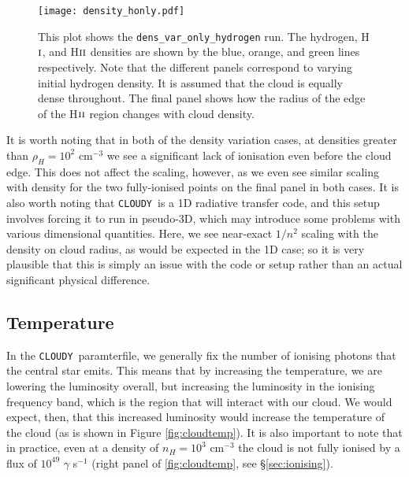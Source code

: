 \documentclass[a4paper]{article}
\newcommand{\cloudy}{{\tt CLOUDY}~}
\begin{document}
\begin{figure}[!h]
\centering
\texttt{[image: density\_honly.pdf]}
    \caption{\small This plot shows the {\tt dens\_var\_only\_hydrogen} run.
        The hydrogen, H$\textsc{i}$, and H$\textsc{ii}$ densities are shown by
        the blue, orange, and green lines respectively. Note that the different
        panels correspond to varying initial hydrogen density. It is assumed
        that the cloud is equally dense throughout. The final panel shows how
        the radius of the edge of the H$\textsc{ii}$ region changes with
        cloud density.}
    \label{fig:densityhonly}
\end{figure}
It is worth noting that in both of the density variation cases, at densities
greater than $\rho_H = 10^2$ cm$^{-3}$ we see a significant lack of ionisation
even before the cloud edge. This does not affect the scaling, however, as 
we even see similar scaling with density for the two fully-ionised points on
the final panel in both cases. It is also worth noting that \cloudy is a 1D
radiative transfer code, and this setup involves forcing it to run in pseudo-3D,
which may introduce some problems with various dimensional quantities. Here,
we see near-exact $1/n^2$ scaling with the density on cloud radius, as would
be expected in the 1D case; so it is very plausible that this is simply an
issue with the code or setup rather than an actual significant physical
difference.

\subsection{Temperature}\label{sec:temperature}

In the \cloudy paramterfile, we generally fix the number of ionising photons
that the central star emits. This means that by increasing the temperature,
we are lowering the luminosity overall, but increasing the luminosity in the
ionising frequency band, which is the region that will interact with our
cloud. We would expect, then, that this increased luminosity would increase
the temperature of the cloud (as is shown in Figure \ref{fig:cloudtemp}). It is
also important to note that in practice, even at a density of $n_H = 10^{3}$
cm$^{-3}$ the cloud is not fully ionised by a flux of $10^{49}$ $\gamma$
s$^{-1}$ (right panel of \ref{fig:cloudtemp}, see §\ref{sec:ionising}).
\end{document}
